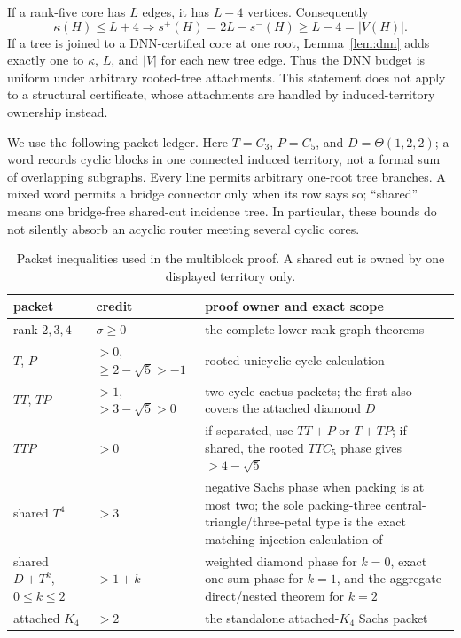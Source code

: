\documentclass[11pt]{article}
\theoremstyle{remark}
\newcommand{\spn}{s^+}
\newcommand{\smn}{s^-}
\newcommand{\sig}{\sigma}
\newcommand{\kap}{\kappa}
\begin{document}
If a rank-five core has $L$ edges, it has $L-4$ vertices.  Consequently
\begin{equation}\label{eq:budget}
 \kap(H)\le L+4
 \Longrightarrow
 \spn(H)=2L-\smn(H)\ge L-4=|V(H)|.
\end{equation}
If a tree is joined to a DNN-certified core at one root, Lemma~\ref{lem:dnn}
adds exactly one to $\kap$, $L$, and $|V|$ for each new tree edge.  Thus the
DNN budget is uniform under arbitrary rooted-tree attachments.  This statement
does not apply to a structural certificate, whose attachments are handled by
induced-territory ownership instead.

We use the following packet ledger.  Here $T=C_3$, $P=C_5$, and
$D=\Theta(1,2,2)$; a word records cyclic blocks in one connected induced
territory, not a formal sum of overlapping subgraphs.  Every line permits
arbitrary one-root tree branches.  A mixed word permits a bridge connector only
when its row says so; ``shared'' means one bridge-free shared-cut incidence
tree.  In particular, these bounds do not silently absorb an acyclic router
meeting several cyclic cores.
\begin{table}[ht]
\centering\small
\begin{tabular}{p{2.4cm}p{2.5cm}p{7.8cm}}
\toprule
packet&credit&proof owner and exact scope\\\midrule
rank $2,3,4$&$\sig\ge0$&the complete lower-rank graph theorems
\cite{Bicyclic,Tricyclic,Tetracyclic}\\
$T$, $P$&$>0$, $\ge2-\sqrt5>-1$&rooted unicyclic cycle calculation
\cite{Bicyclic,TetracyclicCactus}\\
$TT$, $TP$&$>1$, $>3-\sqrt5>0$&two-cycle cactus packets; the first also covers
the attached diamond $D$\\
$TTP$&$>0$&if separated, use $TT+P$ or $T+TP$; if shared, the rooted
$TTC_5$ phase gives $>4-\sqrt5$ \cite{Tricyclic,TetracyclicCactus}\\
shared $T^4$&$>3$&negative Sachs phase when packing is at most two; the sole
packing-three central-triangle/three-petal type is the exact matching-injection
calculation of \cite{PentacyclicCactus}\\
shared $D+T^k$, $0\le k\le2$&$>1+k$&weighted diamond phase for $k=0$,
exact one-sum phase for $k=1$, and the aggregate direct/nested theorem for
$k=2$ \cite{DiamondTwoTriangles}\\
attached $K_4$&$>2$&the standalone attached-$K_4$ Sachs packet
\cite{Tricyclic,Tetracyclic}\\
\bottomrule
\end{tabular}
\caption{Packet inequalities used in the multiblock proof.  A shared cut is
owned by one displayed territory only.}\label{tab:packets}
\end{table}
\end{document}
